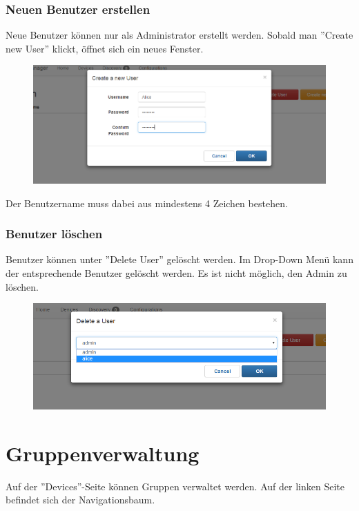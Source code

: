 \subsubsection{Neuen Benutzer erstellen}
Neue Benutzer können nur als Administrator erstellt werden. Sobald man ''Create new User'' klickt, öffnet sich ein neues Fenster.

\begin{figure}[H]
\includegraphics[scale=0.6]{../05_Schlussbericht/images/benutzeranleitung/create_new_user.png}
\end{figure}
Der Benutzername muss dabei aus mindestens 4 Zeichen bestehen.

\subsubsection{Benutzer löschen}
Benutzer können unter ''Delete User'' gelöscht werden. Im Drop-Down Menü kann der entsprechende Benutzer gelöscht werden. Es ist nicht möglich, den Admin zu löschen.
\begin{figure}[H]
\includegraphics[scale=0.7]{../05_Schlussbericht/images/benutzeranleitung/delete_user.png}
\end{figure}

\section{Gruppenverwaltung}
Auf der ''Devices''-Seite können Gruppen verwaltet werden. Auf der linken Seite befindet sich der Navigationsbaum. 

